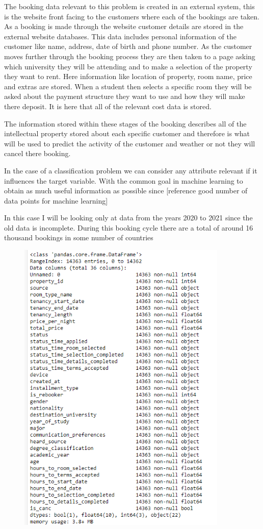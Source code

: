 The booking data relevant to this problem is created in an external system, this is the website front facing to the customers where each of the bookings are taken. As a booking is made through the website customer details are stored in the external website databases. This data includes personal information of the customer like name, address, date of birth and phone number. As the customer moves further through the booking process they are then taken to a page asking which university they will be attending and to make a selection of the property they want to rent. Here information like location of property, room name, price and extras are stored. When a student then selects a specific room they will be asked about the payment structure they want to use and how they will make there deposit. It is here that all of the relevant cost data is stored. \par

The information stored within these stages of the booking describes all of the intellectual property stored about each specific customer and therefore is what will be used to predict the activity of the customer and weather or not they will cancel there booking. 

In the case of a classification problem we can consider any attribute relevant if it influences the target variable. With the common goal in machine learning to obtain as much useful information as possible since [reference good number of data points for machine learning]

In this case I will be looking only at data from the years 2020 to 2021 since the old data is incomplete. During this booking cycle there are a total of around 16 thousand bookings  in some number of countries 

\begin{figure}[hbt!]
 \includegraphics[width=10cm]{figures/df_info.png}
 \caption{}
\end{figure}

